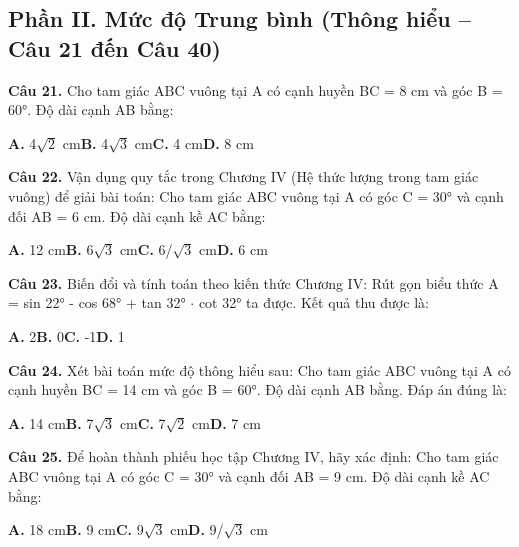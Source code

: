 \documentclass[11pt,a4paper]{article}
\begin{document}
\subsection*{\color{accent} Phần II. Mức độ Trung bình (Thông hiểu -- Câu 21 đến Câu 40)}
\textbf{\color{primary} Câu 21.} Cho tam giác ABC vuông tại A có cạnh huyền BC = 8 cm và góc B = 60°. Độ dài cạnh AB bằng:\par
\hspace*{1.5em}\textbf{A.} 4$\sqrt{2}$ cm\quad\quad \textbf{B.} 4$\sqrt{3}$ cm\quad\quad \textbf{C.} 4 cm\quad\quad \textbf{D.} 8 cm\par\vspace{2pt}
\textbf{\color{primary} Câu 22.} Vận dụng quy tắc trong Chương IV (Hệ thức lượng trong tam giác vuông) để giải bài toán: Cho tam giác ABC vuông tại A có góc C = 30° và cạnh đối AB = 6 cm. Độ dài cạnh kề AC bằng:\par
\hspace*{1.5em}\textbf{A.} 12 cm\quad\quad \textbf{B.} 6$\sqrt{3}$ cm\quad\quad \textbf{C.} 6/$\sqrt{3}$ cm\quad\quad \textbf{D.} 6 cm\par\vspace{2pt}
\textbf{\color{primary} Câu 23.} Biến đổi và tính toán theo kiến thức Chương IV: Rút gọn biểu thức A = sin 22° - cos 68° + tan 32° $\cdot$ cot 32° ta được. Kết quả thu được là:\par
\hspace*{1.5em}\textbf{A.} 2\quad\quad \textbf{B.} 0\quad\quad \textbf{C.} -1\quad\quad \textbf{D.} 1\par\vspace{2pt}
\textbf{\color{primary} Câu 24.} Xét bài toán mức độ thông hiểu sau: Cho tam giác ABC vuông tại A có cạnh huyền BC = 14 cm và góc B = 60°. Độ dài cạnh AB bằng. Đáp án đúng là:\par
\hspace*{1.5em}\textbf{A.} 14 cm\quad\quad \textbf{B.} 7$\sqrt{3}$ cm\quad\quad \textbf{C.} 7$\sqrt{2}$ cm\quad\quad \textbf{D.} 7 cm\par\vspace{2pt}
\textbf{\color{primary} Câu 25.} Để hoàn thành phiếu học tập Chương IV, hãy xác định: Cho tam giác ABC vuông tại A có góc C = 30° và cạnh đối AB = 9 cm. Độ dài cạnh kề AC bằng:\par
\hspace*{1.5em}\textbf{A.} 18 cm\quad\quad \textbf{B.} 9 cm\quad\quad \textbf{C.} 9$\sqrt{3}$ cm\quad\quad \textbf{D.} 9/$\sqrt{3}$ cm\par\vspace{2pt}
\end{document}
